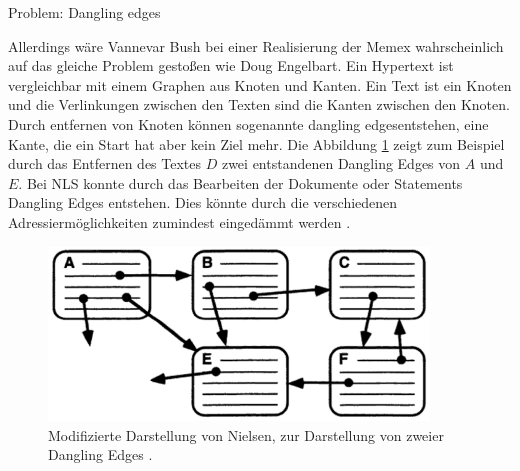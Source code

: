 \begin{section}{Problem: Dangling edges}
\label{sec:dangling}

Allerdings wäre Vannevar Bush bei einer Realisierung der Memex wahrscheinlich auf das gleiche Problem gestoßen wie Doug Engelbart. Ein Hypertext ist vergleichbar mit einem Graphen aus Knoten und Kanten. Ein Text ist ein Knoten und die Verlinkungen zwischen den Texten sind die Kanten zwischen den Knoten. Durch entfernen von Knoten können sogenannte \glqq dangling edges\grqq{ }entstehen, eine Kante, die ein Start hat aber kein Ziel mehr. Die Abbildung \ref{fig:dangle} zeigt zum Beispiel durch das Entfernen des Textes $D$ zwei entstandenen Dangling Edges von $A$ und $E$. Bei NLS konnte durch das Bearbeiten der Dokumente oder Statements Dangling Edges entstehen. Dies könnte durch die verschiedenen Adressiermöglichkeiten zumindest eingedämmt werden \cite{Engelbart1984}.

\begin{figure}[H]
	\centering
	\includegraphics[width=0.9\textwidth]{image/dangle}
	\caption{Modifizierte Darstellung von Nielsen, zur Darstellung von zweier Dangling Edges \cite[S.1]{Nielsen1995}.}
	\label{fig:dangle}
\end{figure}

\end{section}

